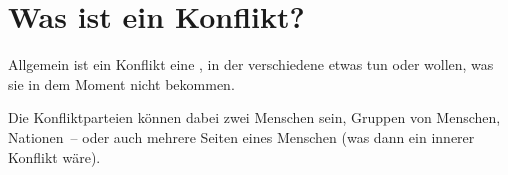 \section{Was ist ein Konflikt?}
\label{konflikt-definition}

Allgemein ist ein Konflikt eine , in der verschiedene  etwas  tun oder wollen, was sie in dem Moment nicht  bekommen.

Die Konfliktparteien können dabei zwei Menschen sein, Gruppen von Menschen, Nationen~-- oder auch mehrere Seiten eines Menschen (was dann ein innerer Konflikt wäre).

